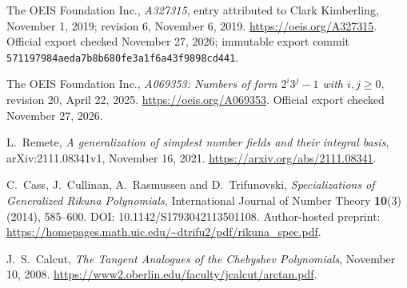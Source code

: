 The OEIS Foundation Inc., \emph{A327315}, entry attributed to Clark
Kimberling, November 1, 2019; revision 6, November 6, 2019.
\url{https://oeis.org/A327315}.
Official export checked November 27, 2026; immutable export commit
\texttt{571197984aeda7b8b680fe3a1f6a43f9898cd441}.

The OEIS Foundation Inc., \emph{A069353: Numbers of form $2^i3^j-1$
with $i,j\ge0$}, revision 20, April 22, 2025.
\url{https://oeis.org/A069353}.
Official export checked November 27, 2026.

L.~Remete, \emph{A generalization of simplest number fields and their
integral basis}, arXiv:2111.08341v1, November 16, 2021.
\url{https://arxiv.org/abs/2111.08341}.

C.~Cass, J.~Cullinan, A.~Rasmussen and D.~Trifunovski,
\emph{Specializations of Generalized Rikuna Polynomials},
International Journal of Number Theory \textbf{10}(3) (2014), 585--600.
DOI: 10.1142/S1793042113501108.
Author-hosted preprint:
\url{https://homepages.math.uic.edu/~dtrifu2/pdf/rikuna_spec.pdf}.

J.~S.~Calcut, \emph{The Tangent Analogues of the Chebyshev Polynomials},
November 10, 2008.
\url{https://www2.oberlin.edu/faculty/jcalcut/arctan.pdf}.
